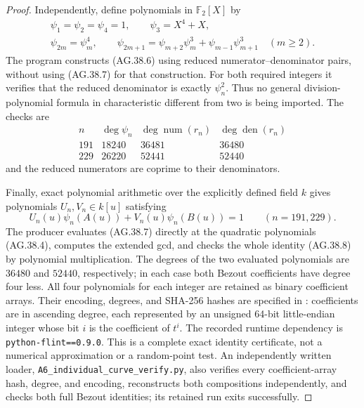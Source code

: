 \begin{proof}
Independently, define polynomials in \(\mathbb F_2[X]\) by
\[
 \begin{gathered}
 \psi_1=\psi_2=\psi_4=1,\qquad \psi_3=X^4+X,\\
 \psi_{2m}=\psi_m^4,\qquad
 \psi_{2m+1}=\psi_{m+2}\psi_m^3+
                       \psi_{m-1}\psi_{m+1}^3\quad(m\ge2).
 \end{gathered}                                                 \tag{AG.38.7}
\]
The program 
constructs (AG.38.6) using reduced numerator--denominator pairs,
without using (AG.38.7) for that construction. For both required
integers it verifies that the reduced denominator is exactly
\(\psi_n^2\). Thus no general division-polynomial formula in
characteristic different from two is being imported. The checks are
\[
\begin{array}{c|r|r|r}
 n&\deg\psi_n&\deg\operatorname{num}(r_n)&
                         \deg\operatorname{den}(r_n)\\\hline
 191&18240&36481&36480\\
 229&26220&52441&52440
\end{array}
\]
and the reduced numerators are coprime to their denominators.

Finally, exact polynomial arithmetic over the explicitly defined
field \(k\) gives polynomials \(U_n,V_n\in k[u]\) satisfying
\[
       U_n(u)\psi_n(A(u))+V_n(u)\psi_n(B(u))=1
                \qquad(n=191,229).                            \tag{AG.38.8}
\]
The producer  evaluates
(AG.38.7) directly at the quadratic polynomials (AG.38.4), computes
the extended gcd, and checks the whole identity (AG.38.8) by
polynomial multiplication. The degrees of the two evaluated
polynomials are \(36480\) and \(52440\), respectively; in
each case both Bezout coefficients have degree four less.
All four polynomials for each integer are retained as binary
coefficient arrays. Their encoding, degrees, and SHA-256 hashes
are specified in :
coefficients are in ascending degree, each represented by an
unsigned 64-bit little-endian integer whose bit \(i\) is the
coefficient of \(t^i\). The recorded runtime dependency is
\texttt{python-flint==0.9.0}. This is a complete exact identity
certificate, not a numerical approximation or a random-point test.
An independently written loader, \texttt{A6\_individual\_curve\_verify.py},
also verifies every coefficient-array hash, degree, and encoding,
reconstructs both compositions independently, and checks both full
Bezout identities; its retained run exits successfully.


\end{proof}
